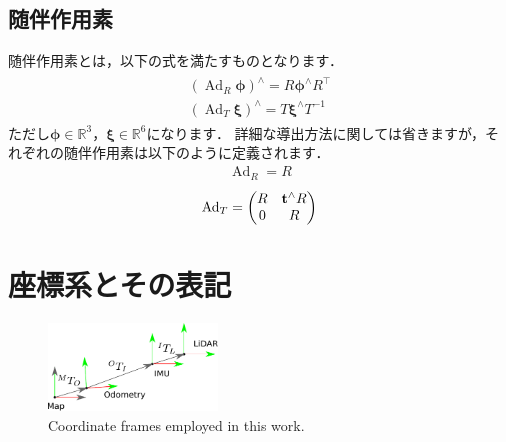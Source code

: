 \subsection{随伴作用素}

随伴作用素とは，以下の式を満たすものとなります．
%
\begin{align}
  \begin{gathered}
    \left( \operatorname{Ad}_{R} \boldsymbol \phi \right)^{\wedge} = R \boldsymbol \phi^{\wedge} R^{\top} \\
%
    \left( \operatorname{Ad}_{T} \boldsymbol \xi \right)^{\wedge} = T \boldsymbol \xi^{\wedge} T^{-1}
  \end{gathered}
  \label{eq:adjoint}
\end{align}
%
ただし$\boldsymbol \phi \in \mathbb{R}^{3}$，$\boldsymbol \xi \in \mathbb{R}^{6}$になります．
詳細な導出方法に関しては省きますが，それぞれの随伴作用素は以下のように定義されます．
%
\begin{align}
  \operatorname{Ad}_{R} = R
  \label{eq:adjoint_so3}
\end{align}
%
\begin{align}
  \operatorname{Ad}_{T} = \left( \begin{matrix}
    R & {\bf t}^{\wedge} R \\
    0 & R
  \end{matrix} \right)
  \label{eq:adjoint_se3}
\end{align}







\section{座標系とその表記}

\begin{figure}[!t]
  \centering
  \includegraphics[width=0.4\textwidth]{../figs/frames.pdf}
  \caption{Coordinate frames employed in this work.}
  \label{fig:frames}
\end{figure}

